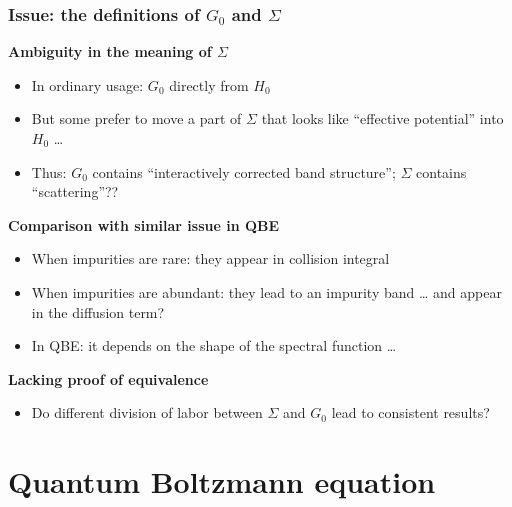 \documentclass[t]{beamer}
\begin{document}
\begin{frame}
\frametitle{Issue: the definitions of $G_0$ and $\Sigma$}

\textbf{Ambiguity in the meaning of $\Sigma$}
\begin{itemize}
    \item In ordinary usage: $G_0$ directly from $H_0$
    \item But some prefer to move a part of $\Sigma$
        that looks like ``effective potential'' into $H_0$ \dots
    \item Thus: $G_0$ contains ``interactively corrected band structure'';
        $\Sigma$ contains ``scattering''??
\end{itemize}    

\vspace{0.25cm}

\textbf{Comparison with similar issue in QBE} \begin{itemize}
    \item When impurities are rare: they appear in collision integral
    \item When impurities are abundant: they lead to an impurity band \dots
        and appear in the diffusion term?
    \item In QBE: 
        it depends on the shape of the spectral function \dots
\end{itemize}

\vspace{0.25cm}

\textbf{Lacking proof of equivalence} \begin{itemize}
    \item Do different division of labor between $\Sigma$ and $G_0$
        lead to consistent results?
\end{itemize}

\end{frame}

\section{Quantum Boltzmann equation}
\end{document}
